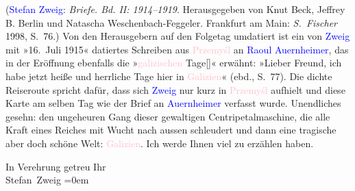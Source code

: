 {{{                  (\textcolor{blue}{Stefan Zweig}: \emph{Briefe. Bd. II: 1914–1919}. Herausgegeben von Knut Beck, Jeffrey B. Berlin und Natascha
                     Weschenbach-Feggeler. Frankfurt am Main: \emph{S. Fischer}{ }1998, S. 76.)
                  Von den Herausgebern auf den Folgetag umdatiert ist ein von \textcolor{blue}{Zweig}
                  mit »16. Juli 1915« datiertes Schreiben aus \textcolor{pink}{Przemyśl}
                  an \textcolor{blue}{Raoul Auernheimer}, das in der Eröffnung 
                  ebenfalls die »\textcolor{pink}{galizischen} Tage[]« erwähnt: »Lieber Freund, ich habe jetzt heiße und herrliche Tage hier in \textcolor{pink}{Galizien}«
                   (ebd., S. 77). Die dichte Reiseroute spricht dafür, dass sich \textcolor{blue}{Zweig} nur
                  kurz in \textcolor{pink}{Przemyśl} aufhielt und diese Karte am selben Tag
                  wie der Brief an \textcolor{blue}{Auernheimer} verfasst wurde.}}}\label{K_L03656-2}
               Unendliches gesehn: den ungeheuren Gang dieser gewaltigen Centripetalmaschine, die
               alle Kraft eines Reiches mit Wucht nach aussen schleudert und dann eine tragische
               aber doch schöne Welt: \textcolor{pink}{Galizien}\ledrightnote{\textcolor{pink}{Galizien}}. Ich werde Ihnen
               viel zu erzählen haben. \pend
           
\pstart
           In Verehrung getreu Ihr{\\[\baselineskip]}\spacefill\mbox{Stefan Zweig}\pend
           \leftskip=0em{}\endnumbering{}  
      